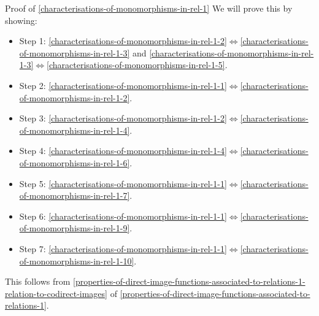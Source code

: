 \begin{Proof}{Proof of \cref{characterisations-of-monomorphisms-in-rel-1}}%
    We will prove this by showing:
    \begin{itemize}
        \item Step 1: \cref{characterisations-of-monomorphisms-in-rel-1-2}$\iff$\cref{characterisations-of-monomorphisms-in-rel-1-3} and \cref{characterisations-of-monomorphisms-in-rel-1-3}$\iff$\cref{characterisations-of-monomorphisms-in-rel-1-5}.
        \item Step 2: \cref{characterisations-of-monomorphisms-in-rel-1-1}$\iff$\cref{characterisations-of-monomorphisms-in-rel-1-2}.
        \item Step 3: \cref{characterisations-of-monomorphisms-in-rel-1-2}$\iff$\cref{characterisations-of-monomorphisms-in-rel-1-4}.
        \item Step 4: \cref{characterisations-of-monomorphisms-in-rel-1-4}$\iff$\cref{characterisations-of-monomorphisms-in-rel-1-6}.
        \item Step 5: \cref{characterisations-of-monomorphisms-in-rel-1-1}$\iff$\cref{characterisations-of-monomorphisms-in-rel-1-7}.
        \item Step 6: \cref{characterisations-of-monomorphisms-in-rel-1-1}$\iff$\cref{characterisations-of-monomorphisms-in-rel-1-9}.
        \item Step 7: \cref{characterisations-of-monomorphisms-in-rel-1-1}$\iff$\cref{characterisations-of-monomorphisms-in-rel-1-10}.
    \end{itemize}

    This follows from \cref{properties-of-direct-image-functions-associated-to-relations-1-relation-to-codirect-images} of \cref{properties-of-direct-image-functions-associated-to-relations-1}.


\end{Proof}
